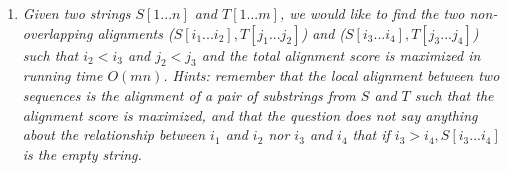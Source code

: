 \documentclass[11pt, oneside]{article}   	%
\DeclareMathOperator*{\argmax}{argmax}
\begin{document}
\begin{enumerate}
Similarly, the set of alignments being considered by semi-global alignment (as defined in the problem) is 
\[
 \mathcal{A}_s =: \left\{G\left(S\left[i...\left|S\right|\right],T\left[1...\ell\right]\right) \mid 1 \le i \le |S|, 1 \le \ell \le |T|\right\}  \cup \{\mathbb{A}_\emptyset\}
\]
and the semi-global alignment problem reduces to $\mathbb{A}_s =: \argmax_{\mathbb{A} \in \mathcal{A}_s} \left\{ f\left(\mathbb{A}\right)  \right\}$. 
Finally let the global alignment be $\mathbb{A}_g =: G(S,T)$ and thus the set considered by the problem contains only one element  $ \mathcal{A}_g =: \left\{\mathbb{A}_g\right\}$.

As defined $ \mathcal{A}_g \subset \mathcal{A}_s \subset \mathcal{A}_\ell$. 
We know that $f(\mathbb{A}_g) \le f(\mathbb{A}_s)$ since $\mathbb{A}_g \in \mathcal{A}_s$, and $ f(\mathbb{A}_s) \ge f(\mathbb{A}')$ for all $\mathbb{A}' \in \mathcal{A}_s$.
The same argument applies to the other cases. 
\qed


\item 
\textit{Given two strings $S[1...n]$ and $T[1...m]$, we would like to find the two non-overlapping alignments 
($S[i_1...i_2],T[j_1...j_2]$) and ($S[i_3...i_4],T[j_3...j_4]$) such that $i_2<i_3$ and $j_2<j_3$ and the total alignment score is maximized 
in running time $O(mn)$. 
Hints: remember that the local alignment between two sequences is the alignment of a pair of substrings from $S$ and $T$ such that the alignment score is maximized, 
and that the question does not say anything about the relationship between $i_1$ and $i_2$ nor $i_3$ and $i_4$ that if $i_3>i_4, S[i_3...i_4]$ is the empty string.}


\end{enumerate}
\end{document}
